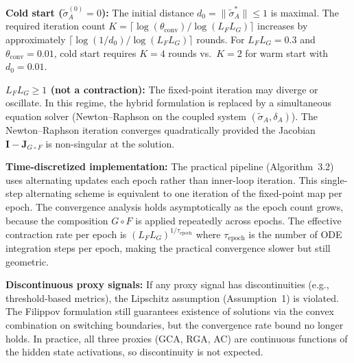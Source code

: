 \begin{boundary-case}
\textbf{Cold start ($\tilde{\sigma}_A^{(0)} = 0$):}
The initial distance $d_0 = \|\tilde{\sigma}_A^*\| \leq 1$ is maximal.
The required iteration count $K = \lceil \log(\theta_{\text{conv}}) / \log(L_F L_G) \rceil$
increases by approximately $\lceil \log(1/d_0) / \log(L_F L_G) \rceil$ rounds.
For $L_F L_G = 0.3$ and $\theta_{\text{conv}} = 0.01$, cold start
requires $K = 4$ rounds vs.\ $K = 2$ for warm start with
$d_0 = 0.01$.

\textbf{$L_F L_G \geq 1$ (not a contraction):}
The fixed-point iteration may diverge or oscillate. In this regime,
the hybrid formulation is replaced by a simultaneous equation solver
(Newton--Raphson on the coupled system $(\tilde{\sigma}_A, \delta_A)$).
The Newton--Raphson iteration converges quadratically provided the
Jacobian $\mathbf{I} - \mathbf{J}_{G \circ F}$ is non-singular at the
solution.

\textbf{Time-discretized implementation:}
The practical pipeline (Algorithm~3.2) uses alternating updates each
epoch rather than inner-loop iteration. This single-step alternating
scheme is equivalent to one iteration of the fixed-point map per
epoch. The convergence analysis holds asymptotically as the epoch
count grows, because the composition $G \circ F$ is applied
repeatedly across epochs. The effective contraction rate per epoch is
$(L_F L_G)^{1/\tau_{\text{epoch}}}$ where $\tau_{\text{epoch}}$ is
the number of ODE integration steps per epoch, making the practical
convergence slower but still geometric.

\textbf{Discontinuous proxy signals:}
If any proxy signal has discontinuities (e.g., threshold-based metrics),
the Lipschitz assumption (Assumption~1) is violated. The Filippov
formulation still guarantees existence of solutions via the convex
combination on switching boundaries, but the convergence rate bound
no longer holds. In practice, all three proxies (GCA, RGA, AC) are
continuous functions of the hidden state activations, so
discontinuity is not expected.
\end{boundary-case}

